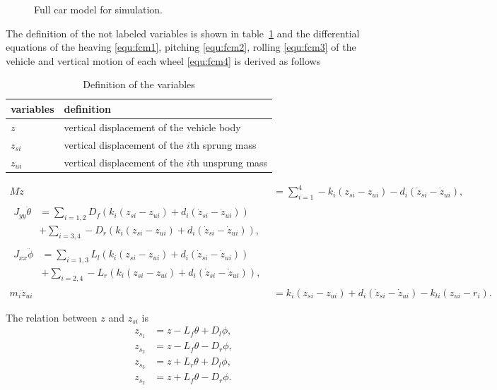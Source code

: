 \begin{figure}%
\footnotesize
\centering

\caption{Full car model for simulation.}
\label{fig:fullcar}
\end{figure}
 
The definition of the not labeled variables is shown in table~\ref{tbl:def_of_var} and the differential equations of the heaving \eqref{equ:fcm1}, pitching \eqref{equ:fcm2}, rolling \eqref{equ:fcm3} of the vehicle and vertical motion of each wheel \eqref{equ:fcm4} is derived as follows

\begin{table}
\centering
\caption{Definition of the variables}
\label{tbl:def_of_var}
\begin{tabular}{ll} \hline
variables & definition \\ \hline
$z$ & vertical displacement of the vehicle body \\
$z_{si}$ & vertical displacement of the $i$th sprung mass \\
$z_{ui}$ & vertical displacement of the $i$th unsprung mass \\ \hline
\end{tabular}
\end{table}
 
\begin{align}
    M\ddot{z} &=\sum_{i=1}^4-k_{i}(z_{si}-z_{ui})-d_{i}(\dot{z}_{si}-\dot{z}_{ui}) \label{equ:fcm1}, \\ 
    \begin{split}
     J_{yy}\ddot{\theta}&=\sum_{i=1,2}D_f(k_{i}(z_{si}-z_{ui})+d_{i}(\dot{z}_{si}-\dot{z}_{ui}))\\
     &+\sum_{i=3,4}-D_r(k_{i}(z_{si}-z_{ui})+d_{i}(\dot{z}_{si}-\dot{z}_{ui})),
     \end{split} \label{equ:fcm2} \\ 
     \begin{split}
     J_{xx}\ddot{\phi}&=\sum_{i=1,3}L_l(k_{i}(z_{si}-z_{ui})+d_{i}(\dot{z}_{si}-\dot{z}_{ui}))\\
     &+\sum_{i=2,4}-L_r(k_{i}(z_{si}-z_{ui})+d_{i}(\dot{z}_{si}-\dot{z}_{ui})),
     \end{split} \label{equ:fcm3}\\ 
     m_i\ddot{z}_{ui}&=k_{i}(z_{si}-z_{ui})+d_{i}(\dot{z}_{si}-\dot{z}_{ui})-k_{ti}(z_{ui}-r_i). \label{equ:fcm4}
\end{align}

The relation between $z$ and $z_{si}$ is
 \begin{align}
     z_{s_1}&=z-L_f\theta+D_l\phi,\\
     z_{s_2}&=z-L_f\theta-D_r\phi,\\
     z_{s_3}&=z+L_r\theta+D_l\phi,\\
     z_{s_2}&=z+L_f\theta-D_r\phi.
 \end{align}

